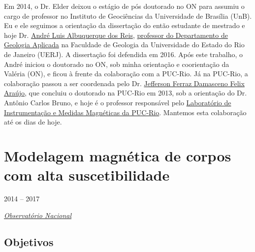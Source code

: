 Em 2014, o Dr. Elder deixou o estágio de pós doutorado no ON para assumiu o cargo de
professor no Instituto de Geociências da Universidade de Brasília (UnB). 
Eu e ele seguimos a orientação da dissertação do então estudante de mestrado e hoje
Dr. \href{https://lattes.cnpq.br/1075610796165589}{André Luis Albuquerque dos Reis},
\href{https://www.fgel.uerj.br/site/departamentos/depto-de-geologia-aplicada/dgap-quadro-de-pessoal/}{professor do Departamento de Geologia Aplicada} 
na Faculdade de Geologia da Universidade do
Estado do Rio de Janeiro (UERJ). A dissertação foi defendida em 2016.
Após este trabalho, o André iniciou o doutorado no ON, sob minha orientação e
coorientação da Valéria (ON), e ficou à frente da colaboração com a PUC-Rio. 
Já na PUC-Rio, a colaboração passou a ser coordenada pelo Dr. \href{https://lattes.cnpq.br/0190128964748843}{Jefferson Ferraz Damasceno
Felix Araújo}, que concluiu o doutorado na PUC-Rio em 2013, sob a orientação do 
Dr. Antônio Carlos Bruno, e hoje é o professor responsável pelo 
\href{https://www.fis.puc-rio.br/instrumentacao-e-medidas-magneticas/}{Laboratório de Instrumentação e Medidas Magnéticas da PUC-Rio}.
Mantemos esta colaboração até os dias de hoje.

\section{Modelagem magnética de corpos com alta suscetibilidade} 
\label{sec:projeto-Diego}

 2014 -- 2017
\vspace{0.3\baselineskip}\\
\noindent\parbox{0.03\textwidth}{\vspace{-0.2\baselineskip}\faUniversity} \href{https://www.gov.br/observatorio/pt-br}{\textsl{Observatório Nacional}}
\parbox{0.03\textwidth}{\vspace{-0.2\baselineskip} \hfill {}}

\subsection*{Objetivos}

